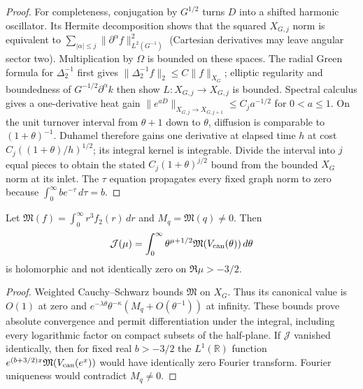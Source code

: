 \begin{proof}
For completeness, conjugation by $G^{1/2}$ turns $D$ into a shifted
harmonic oscillator. Its Hermite decomposition shows that the squared
$X_{G,j}$ norm is equivalent to
$\sum_{|\alpha|\le j}\|\partial^\alpha f\|_{L^2(G^{-1})}^2$
(Cartesian derivatives may leave angular sector two). Multiplication
by $\Omega$ is bounded on these spaces. The radial Green formula for
$\Delta_2^{-1}$ first gives $\|\Delta_2^{-1}f\|_2\le C\|f\|_{X_G}$;
elliptic regularity and boundedness of
$G^{-1/2}\partial^\alpha k$ then show $L:X_{G,j}\to X_{G,j}$ is
bounded. Spectral calculus gives a one-derivative heat gain
$\|e^{aD}\|_{X_{G,j}\to X_{G,j+1}}\le C_ja^{-1/2}$ for $0<a\le1$.
On the unit turnover interval from $\theta+1$ down to $\theta$,
diffusion is comparable to $(1+\theta)^{-1}$. Duhamel therefore gains
one derivative at elapsed time $h$ at cost
$C_j((1+\theta)/h)^{1/2}$; its integral kernel is integrable.
Divide the interval into $j$ equal pieces to obtain the stated
$C_j(1+\theta)^{j/2}$ bound from the bounded $X_G$ norm at its inlet.
The $\tau$ equation propagates every fixed graph norm to zero because
$\int_0^\infty be^{-\tau}\,d\tau=b$.
\end{proof}

\begin{corollary}\label{cor:short-mellin}
Let $\mathfrak M(f)=\int_0^\infty r^3f_2(r)\,dr$ and
$M_q=\mathfrak M(q)\ne0$. Then
\[
 \mathcal J(\mu)=\int_0^\infty
       \theta^{\mu+1/2}\mathfrak M(V_{\rm can}(\theta))\,d\theta
\]
is holomorphic and not identically zero on $\Re\mu>-3/2$.
\end{corollary}
\begin{proof}
Weighted Cauchy--Schwarz bounds $\mathfrak M$ on $X_G$. Thus its
canonical value is $O(1)$ at zero and
$e^{-\lambda\theta}\theta^{-\kappa}(M_q+O(\theta^{-1}))$ at infinity.
These bounds prove absolute convergence and permit differentiation
under the integral, including every logarithmic factor on compact
subsets of the half-plane. If $\mathcal J$ vanished identically, then
for fixed real $b>-3/2$ the $L^1(\mathbb R)$ function
$e^{(b+3/2)x}\mathfrak M(V_{\rm can}(e^x))$ would have identically zero
Fourier transform. Fourier uniqueness would contradict $M_q\ne0$.
\end{proof}
